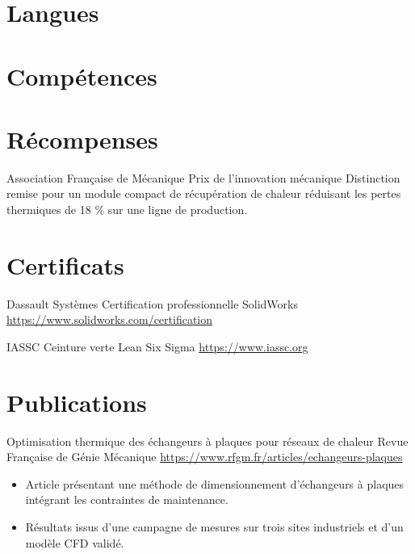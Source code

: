 \documentclass[a4paper, serif, 10pt]{moderncv}
\begin{document}
\section{Langues}

\section{Compétences}

\section{Récompenses}

        {Association Française de Mécanique}
        {Prix de l'innovation mécanique}
        {}
        {}
        {Distinction remise pour un module compact de récupération de chaleur réduisant les pertes thermiques de 18 \% sur une ligne de production.}
\section{Certificats}

        {Dassault Systèmes}
        {Certification professionnelle SolidWorks}
        {\url{https://www.solidworks.com/certification}}
        {}
        {}

        {IASSC}
        {Ceinture verte Lean Six Sigma}
        {\url{https://www.iassc.org}}
        {}
        {}
\section{Publications}

        {Optimisation thermique des échangeurs à plaques pour réseaux de chaleur}
        {Revue Française de Génie Mécanique}
        {\url{https://www.rfgm.fr/articles/echangeurs-plaques}}
        {}
        {\begin{itemize}
\item Article présentant une méthode de dimensionnement d'échangeurs à plaques intégrant les contraintes de maintenance.
\item Résultats issus d'une campagne de mesures sur trois sites industriels et d'un modèle CFD validé.
\end{itemize}}
\end{document}

